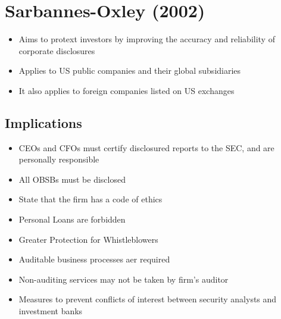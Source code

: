 \section*{Sarbannes-Oxley (2002)}

\begin{itemize}
\item Aims to protext investors by improving the accuracy and reliability of corporate disclosures
\item Applies to US public companies and their global subsidiaries
\item It also applies to foreign companies listed on US exchanges
\end{itemize}


\subsection*{Implications}

\begin{itemize}
\item CEOs and CFOs must certify disclosured reports to the SEC, and are personally responsible
\item All OBSBs must be disclosed
\item State that the firm has a code of ethics
\item Personal Loans are forbidden
\item Greater Protection for Whistleblowers
\item Auditable business processes aer required
\item Non-auditing services may not be taken by firm's auditor
\item Measures to prevent conflicts of interest between security analysts and investment banks
\end{itemize}
